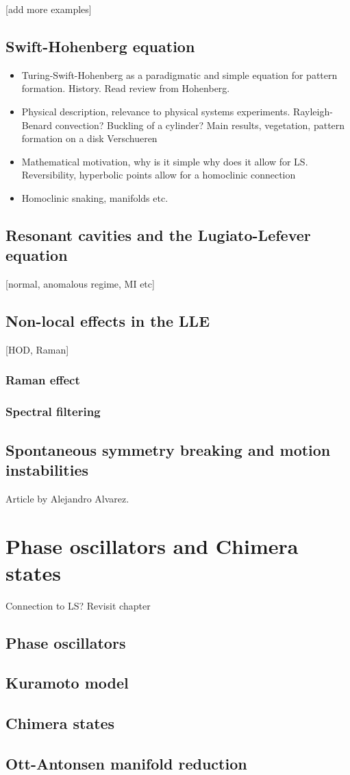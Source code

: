 [add more examples]


\subsection{Swift-Hohenberg equation}

\begin{itemize}
    \item Turing-Swift-Hohenberg as a paradigmatic and simple equation for pattern
formation. History. Read review from Hohenberg.
    \item Physical description, relevance to physical systems experiments. 
    Rayleigh-Benard convection? Buckling of a cylinder? Main results, vegetation,
    pattern formation on a disk Verschueren
    \item Mathematical motivation, why is it simple why does it allow for LS.
Reversibility, hyperbolic points allow for a homoclinic connection
    \item Homoclinic snaking, manifolds etc.
\end{itemize}

\subsection{Resonant cavities and the Lugiato-Lefever equation}
[normal, anomalous regime, MI etc]

\subsection{Non-local effects in the LLE}
[HOD, Raman]

\subsubsection{Raman effect}
\subsubsection{Spectral filtering}

\subsection{Spontaneous symmetry breaking and motion instabilities}
Article by Alejandro Alvarez.

\section{Phase oscillators and Chimera states}
Connection to LS?  Revisit chapter
\subsection{Phase oscillators}
\label{sec:phase_oscillators}

\subsection{Kuramoto model}

\subsection{Chimera states}

\subsection{Ott-Antonsen manifold reduction}